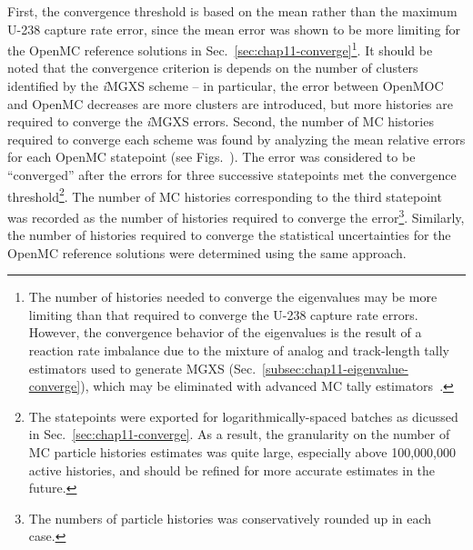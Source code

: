 First, the convergence threshold is based on the mean rather than the maximum U-238 capture rate error, since the mean error was shown to be more limiting for the OpenMC reference solutions in Sec.~\ref{sec:chap11-converge}\footnote{The number of histories needed to converge the eigenvalues may be more limiting than that required to converge the U-238 capture rate errors. However, the convergence behavior of the eigenvalues is the result of a reaction rate imbalance due to the mixture of analog and track-length tally estimators used to generate \ac{MGXS} (Sec.~\ref{subsec:chap11-eigenvalue-converge}), which may be eliminated with advanced \ac{MC} tally estimators~\cite{nelson2014improved}.}. It should be noted that the convergence criterion is depends on the number of clusters identified by the \textit{i}\ac{MGXS} scheme -- in particular, the error between OpenMOC and OpenMC decreases are more clusters are introduced, but more histories are required to converge the \textit{i}\ac{MGXS} errors. Second, the number of \ac{MC} histories required to converge each scheme was found by analyzing the mean relative errors for each OpenMC statepoint (see Figs.~). The error was considered to be ``converged'' after the errors for three successive statepoints met the convergence threshold\footnote{The statepoints were exported for logarithmically-spaced batches as dicussed in Sec.~\ref{sec:chap11-converge}. As a result, the granularity on the number of \ac{MC} particle histories estimates was quite large, especially above 100,000,000 active histories, and should be refined for more accurate estimates in the future.}. The number of \ac{MC} histories corresponding to the third statepoint was recorded as the number of histories required to converge the error\footnote{The numbers of particle histories was conservatively rounded up in each case.}. Similarly, the number of histories required to converge the statistical uncertainties for the OpenMC reference solutions were determined using the same approach.

